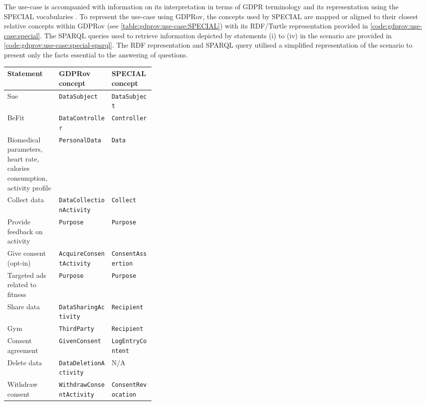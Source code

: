 The use-case is accompanied with information on its interpretation in terms of GDPR terminology \cite{bonatti_d1.7_2018} and its representation using the SPECIAL vocabularies \cite{kirrane_scalable_2018}. To represent the use-case using GDPRov, the concepts used by SPECIAL are mapped or aligned to their closest relative concepts within GDPRov (see \autoref{table:gdprov:use-case:SPECIAL}) with its RDF/Turtle representation provided in \autoref{code:gdprov:use-case:special}. The SPARQL queries used to retrieve information depicted by statements (i) to (iv) in the scenario are provided in \autoref{code:gdprov:use-case:special-sparql}. The RDF representation and SPARQL query utilised a simplified representation of the scenario to present only the facts essential to the answering of questions. 
\begin{center}
\footnotesize
\begin{tabularx}{\textwidth}{|p{0.35\linewidth}|X|X|}
\caption{GDPRov concepts to represent external use-case from SPECIAL} \label{table:gdprov:use-case:SPECIAL} \\
\toprule
\textbf{Statement} & \textbf{GDPRov concept} & \textbf{SPECIAL concept} \\
\midrule
\endhead
Sue & \texttt{DataSubject} & \texttt{DataSubject} \\ \hline
BeFit & \texttt{DataController} & \texttt{Controller} \\ \hline
Biomedical parameters, heart rate, calories consumption, activity profile & \texttt{PersonalData} & \texttt{Data} \\ \hline
Collect data & \texttt{DataCollectionActivity} & \texttt{Collect} \\ \hline
Provide feedback on activity & \texttt{Purpose} & \texttt{Purpose} \\ \hline
Give consent (opt-in) & \texttt{AcquireConsentActivity} & \texttt{ConsentAssertion} \\ \hline
Targeted ads related to fitness & \texttt{Purpose} & \texttt{Purpose} \\ \hline
Share data & \texttt{DataSharingActivity} & \texttt{Recipient} \\ \hline
Gym & \texttt{ThirdParty} & \texttt{Recipient} \\ \hline
Consent agreement & \texttt{GivenConsent} & \texttt{LogEntryContent} \\ \hline
Delete data & \texttt{DataDeletionActivity} & N/A \\ \hline
Withdraw consent & \texttt{WithdrawConsentActivity} & \texttt{ConsentRevocation} \\
\bottomrule
\end{tabularx}
\end{center}
